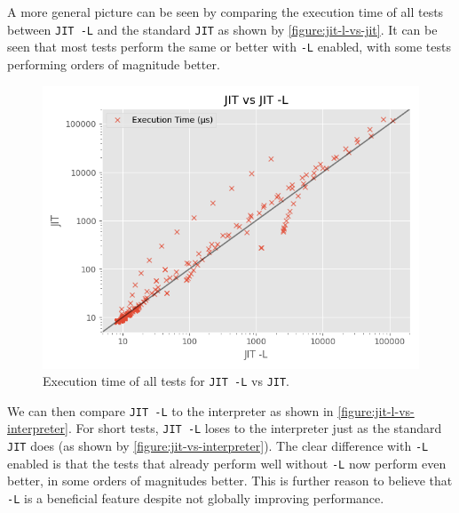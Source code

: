 A more general picture can be seen by comparing the execution time of all tests between \texttt{JIT -L} and the standard \texttt{JIT} as shown by \autoref{figure:jit-l-vs-jit}. It can be seen that most tests perform the same or better with \texttt{-L} enabled, with some tests performing orders of magnitude better.

\begin{figure}[H]
    \centering
    \includegraphics[scale=0.75]{output/graphs/scatter/vs/JIT -L-vs-JIT-time.png}
    \caption{Execution time of all tests for \texttt{JIT -L} vs \texttt{JIT}.}
    \label{figure:jit-l-vs-jit}
\end{figure}

We can then compare \texttt{JIT -L} to the interpreter as shown in \autoref{figure:jit-l-vs-interpreter}. For short tests, \texttt{JIT -L} loses to the interpreter just as the standard \texttt{JIT} does (as shown by \autoref{figure:jit-vs-interpreter}). The clear difference with \texttt{-L} enabled is that the tests that already perform well without \texttt{-L} now perform even better, in some orders of magnitudes better. This is further reason to believe that \texttt{-L} is a beneficial feature despite not globally improving performance.

